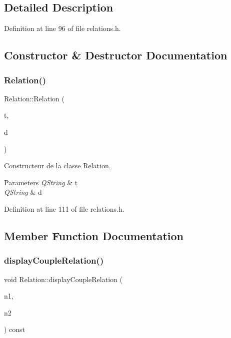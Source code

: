 \subsection{Detailed Description}


Definition at line 96 of file relations.\+h.



\subsection{Constructor \& Destructor Documentation}
\mbox{\label{class_relation_ac665710061b98c5e13acaf3d9c5f68f6}} 
\subsubsection{\texorpdfstring{Relation()}{Relation()}}
{\footnotesize\ttfamily Relation\+::\+Relation (\begin{DoxyParamCaption}\item[{Q\+String}]{t,  }\item[{Q\+String}]{d }\end{DoxyParamCaption})\hspace{0.3cm}{\ttfamily [inline]}}



Constructeur de la classe \hyperlink{class_relation}{Relation}. 


\begin{DoxyParams}{Parameters}
{\em Q\+String} & t \\
\hline
{\em Q\+String} & d \\
\hline
\end{DoxyParams}


Definition at line 111 of file relations.\+h.



\subsection{Member Function Documentation}
\mbox{\label{class_relation_aa6974a453611dee90f2ca2da9fe30de6}} 
\subsubsection{\texorpdfstring{display\+Couple\+Relation()}{displayCoupleRelation()}}
{\footnotesize\ttfamily void Relation\+::display\+Couple\+Relation (\begin{DoxyParamCaption}\item[{\hyperlink{class_note}{Note} $\ast$}]{n1,  }\item[{\hyperlink{class_note}{Note} $\ast$}]{n2 }\end{DoxyParamCaption}) const}



